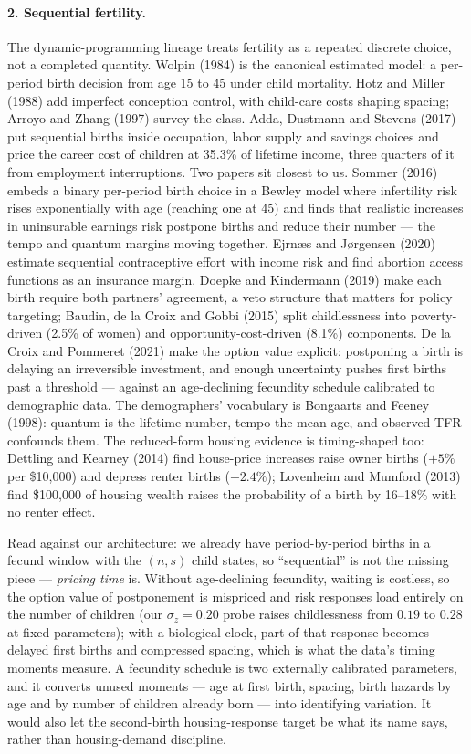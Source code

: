 \documentclass[10pt]{article}
\begin{document}
\paragraph{2. Sequential fertility.}
The dynamic-programming lineage treats fertility as a repeated discrete
choice, not a completed quantity. Wolpin (1984) is the canonical estimated
model: a per-period birth decision from age 15 to 45 under child mortality.
Hotz and Miller (1988) add imperfect conception control, with child-care
costs shaping spacing; Arroyo and Zhang (1997) survey the class. Adda,
Dustmann and Stevens (2017) put sequential births inside occupation, labor
supply and savings choices and price the career cost of children at 35.3\%
of lifetime income, three quarters of it from employment interruptions. Two
papers sit closest to us. Sommer (2016) embeds a binary per-period birth
choice in a Bewley model where infertility risk rises exponentially with age
(reaching one at 45) and finds that realistic increases in uninsurable
earnings risk postpone births and reduce their number --- the tempo and
quantum margins moving together. Ejrn\ae s and J\o rgensen (2020) estimate
sequential contraceptive effort with income risk and find abortion access
functions as an insurance margin. Doepke and Kindermann (2019) make each
birth require both partners' agreement, a veto structure that matters for
policy targeting; Baudin, de la Croix and Gobbi (2015) split childlessness
into poverty-driven (2.5\% of women) and opportunity-cost-driven (8.1\%)
components. De la Croix and Pommeret (2021) make the option value explicit:
postponing a birth is delaying an irreversible investment, and enough
uncertainty pushes first births past a threshold --- against an
age-declining fecundity schedule calibrated to demographic data. The
demographers' vocabulary is Bongaarts and Feeney (1998): quantum is the
lifetime number, tempo the mean age, and observed TFR confounds them. The
reduced-form housing evidence is timing-shaped too: Dettling and Kearney
(2014) find house-price increases raise owner births ($+5\%$ per \$10{,}000)
and depress renter births ($-2.4\%$); Lovenheim and Mumford (2013) find
\$100{,}000 of housing wealth raises the probability of a birth by 16--18\%
with no renter effect.

Read against our architecture: we already have period-by-period births in a
fecund window with the $(n,s)$ child states, so ``sequential'' is not the
missing piece --- \emph{pricing time} is. Without age-declining fecundity,
waiting is costless, so the option value of postponement is mispriced and
risk responses load entirely on the number of children (our $\sigma_z=0.20$
probe raises childlessness from $0.19$ to $0.28$ at fixed parameters); with
a biological clock, part of that response becomes delayed first births and
compressed spacing, which is what the data's timing moments measure. A
fecundity schedule is two externally calibrated parameters, and it converts
unused moments --- age at first birth, spacing, birth hazards by age and by
number of children already born --- into identifying variation. It would
also let the second-birth housing-response target be what its name says,
rather than housing-demand discipline.
\end{document}
